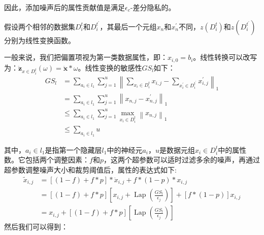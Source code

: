 因此，添加噪声后的属性贡献值是满足$\epsilon_{c}$-差分隐私的。

假设两个相邻的数据集$D_{i}^{t}$和$D_{i}^{t^{\prime}}$，其最后一个元组$x_{n}$和$x_{n}^{\prime}$不同，$z\left(D_{i}^{t}\right)$和$z\left(D_{i}^{t^{\prime}}\right)$分别为线性变换函数。

一般来说，我们把偏置项视为第一类数据属性，即：$x_{i,0}=b_{i}$。线性转换可以改写为：$\ddot{\mathbf{z}}_{x \in D_{i}^{t}}(\omega)=\ddot{\mathbf{x}} * \omega$。线性变换的敏感性$G S_{l}$如下：
\begin{equation}
\begin{aligned}
G S_{l} &=\sum_{a_{i} \in l_{1}} \sum_{j=1}^{u}\left\|\sum_{x_{i} \in D_{i}^{t}} x_{i, j}-\sum_{x_{i}^{\prime} \in D_{i}^{t^{\prime}}} x_{i, j}^{\prime}\right\|_{1} \\
&=\sum_{a_{i} \in l_{1}} \sum_{j=1}^{u}\left\|x_{n, j}-x_{n, j}^{\prime}\right\|_{1} \\
& \leq \sum_{a_{i} \in l_{1}} \sum_{j=1}^{u} \max _{x_{i} \in D_{i}^{t}}\left\|x_{n, j}\right\|_{1} \\
& \leq \sum_{a_{i} \in l_{1}} u
\end{aligned}
\end{equation}

其中，$a_{i} \in l_{1}$是指第一个隐藏层$l_{1}$中的神经元$a_{i}$，$u$是数据元组$x_{i} \in D_{i}^{t}$中的属性数。它包括两个调整因素：$f$和$p$，这两个超参数可以适时过滤多余的噪声，再通过超参数调整噪声大小和裁剪阈值后，属性的表达式如下:
\begin{equation}
\begin{aligned}
\tilde{x}_{i, j} &=[(1-f)+f * p] * \ddot{x}_{i, j}+f *(1-p) * x_{i, j} \\
&=[(1-f)+f * p]\left[x_{i, j}+\operatorname{Lap}\left(\frac{G S_{l}}{\epsilon_{j}}\right)\right]+[f *(1-p)] x_{i, j} \\
&=x_{i, j}+[(1-f)+f * p]\left[\operatorname{Lap}\left(\frac{G S_{l}}{\epsilon_{j}}\right)\right]
\end{aligned}
\end{equation}
然后我们可以得到：

